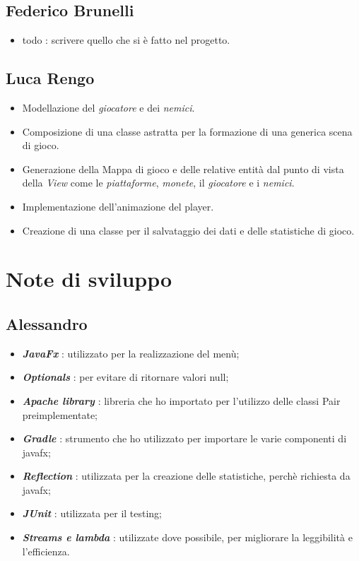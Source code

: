 \subsection*{Federico Brunelli}

\begin{itemize}
	\item  todo : scrivere quello che si è fatto nel progetto.
\end{itemize}

\subsection*{Luca Rengo}

\begin{itemize}
	\item  \textsf{\small Modellazione del \emph{giocatore} e dei \emph{nemici}.}
	\item \textsf{\small Composizione di una classe astratta per la formazione di una generica scena di gioco.}
	\item \textsf{\small Generazione della Mappa di gioco e delle relative entità dal punto di vista della \emph{View} come le \emph{piattaforme}, \emph{monete}, il \emph{giocatore} e i \emph{nemici}.}
	\item \textsf{\small Implementazione dell'animazione del player.}
	\item \textsf{\small Creazione di una classe per il salvataggio dei dati e delle statistiche di gioco.}
\end{itemize}

\section{Note di sviluppo}

\subsection*{Alessandro}

\begin{itemize}
	\item  \textbf{\textit{JavaFx}} : utilizzato per la realizzazione del menù;
	\item \textbf{\textit{Optionals}} : per evitare di ritornare valori null;
	\item \textbf{\textit{Apache library}} : libreria che ho importato per l'utilizzo delle classi Pair preimplementate;
	\item \textbf{\textit{Gradle}} : strumento che ho utilizzato per importare le varie componenti di javafx;
	\item \textbf{\textit{Reflection}} : utilizzata per la creazione delle statistiche, perchè richiesta da javafx;
	\item \textbf{\textit{JUnit}} : utilizzata per il testing;
	\item \textbf{\textit{Streams e lambda}} : utilizzate dove possibile, per migliorare la leggibilità e l'efficienza.
\end{itemize}

